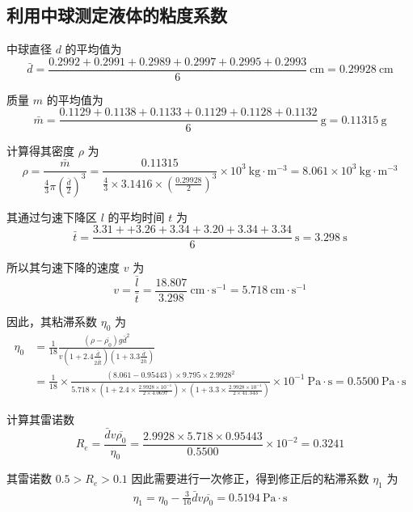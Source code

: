 \documentclass[10pt,a4paper]{article}	%
\begin{document}




	\subsection{利用中球测定液体的粘度系数}
	
	中球直径 $d$ 的平均值为
	$$
	\bar{d}=\frac{0.2992+0.2991+0.2989+0.2997+0.2995+0.2993}{6} \mathrm{~cm}=0.29928 \mathrm{~cm}
	$$

	质量 $m$ 的平均值为
	$$
	\bar{m}=\frac{0.1129+0.1138+0.1133+0.1129+0.1128+0.1132}{6} \mathrm{~g}=0.11315 \mathrm{~g}
	$$

	计算得其密度 $\rho$ 为
	$$
	\rho=\frac{\bar{m}}{\frac{4}{3} \pi\left(\frac{\bar{d}}{2}\right)^3}=\frac{0.11315}{\frac{4}{3} \times 3.1416 \times\left(\frac{0.29928}{2}\right)^3} \times 10^3 \mathrm{~kg} \cdot \mathrm{m}^{-3}=8.061 \times 10^3 \mathrm{~kg} \cdot \mathrm{m}^{-3}
	$$

	其通过匀速下降区 $l$ 的平均时间 $t$ 为
	$$
	\bar{t}=\frac{3.31++3.26+3.34+3.20+3.34+3.34}{6} \mathrm{~s}=3.298 \mathrm{~s}
	$$

	所以其匀速下降的速度 $v$ 为
	$$
	v=\frac{\bar{l}}{\bar{t}}=\frac{18.807}{3.298} \mathrm{~cm} \cdot \mathrm{s}^{-1}=5.718 \mathrm{~cm} \cdot \mathrm{s}^{-1}
	$$

	因此，其粘滞系数 $\eta_0$ 为
	$$
	\begin{aligned}
	\eta_0&=\frac{1}{18} \frac{\left(\rho-\overline{\rho_0}\right) g \bar{d}^2}{v\left(1+2.4 \frac{\bar{d}}{2 \overline{\bar{R}}}\right)\left(1+3.3 \frac{\bar{d}}{2 \bar{h}}\right)}\\
	&=\frac{1}{18} \times \frac{(8.061-0.95443) \times 9.795 \times 2.9928^2}{5.718 \times\left(1+2.4 \times \frac{2.9928 \times 10^{-1}}{2 \times 4.0697}\right) \times\left(1+3.3 \times \frac{2.9928 \times 10^{-1}}{2 \times 41.343}\right)} \times 10^{-1} \mathrm{~P a} \cdot \mathrm{s}=0.5500 \mathrm{~P a} \cdot \mathrm{s}	
	\end{aligned}
	$$

	计算其雷诺数
	$$
	R_{e}=\frac{\bar{d} v \overline{\rho_0}}{\eta_0}=\frac{2.9928 \times 5.718 \times 0.95443}{0.5500} \times 10^{-2}=0.3241
	$$

	其雷诺数 $0.5>R_{e} > 0.1$ 因此需要进行一次修正，得到修正后的粘滞系数 $\eta_1$ 为
	$$
	\begin{aligned}
	\eta_1 = \eta_0 - \frac{3}{16}\bar{d} v \overline{\rho_0} = 0.5194 \mathrm{~P a} \cdot \mathrm{s}	
	\end{aligned}
	$$
\end{document}
